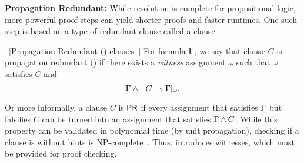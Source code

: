 
\textbf{Propagation Redundant:} While resolution is complete for propositional
logic, more powerful proof steps can yield shorter proofs and faster runtimes.
One such step is based on a type of redundant clause called a \pr clause.

\begin{definition}~\label{def:pr}[Propagation Redundant (\pr) clauses~\cite{prclauses}]
    For formula $\Gamma$, we say that clause $C$ is propagation redundant
    (\pr) if there exists a \emph{witness} assignment $\omega$ such that
    $\omega$ satisfies $C$ and
$$
    \Gamma \land \lnot C \vdash_1 \Gamma|_\omega.
$$
\end{definition}


Or more informally, a clause $C$ is $\textsf{PR}$ if every assignment that satisfies
$\Gamma$ but falsifies $C$ can be turned into an assignment that satisfies
$\Gamma \land C$. While this property can be validated in polynomial time
(by unit propagation), checking if a clause is \pr
without hints is NP-complete~\cite{prclauses}. Thus, \pr introduces witnesses,
which must be provided for proof checking.  






